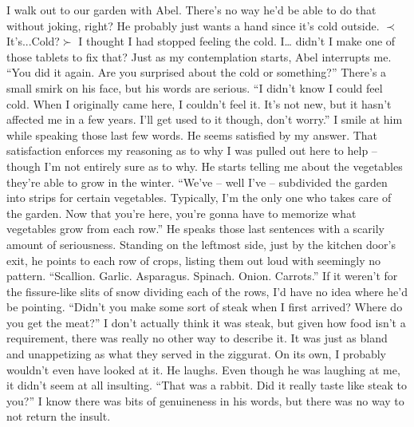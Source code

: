 \documentclass[openany, 12pt]{book}
\newcommand\tab[1][1cm]{\hspace*{#1}}
\begin{document}
\tab
I walk out to our garden with Abel. There’s no way he’d be able to do that without joking, right? He probably just wants a hand since it’s cold outside.\newline
\tab
$\prec$It's...Cold?$\succ$\newline
\tab
I thought I had stopped feeling the cold. I… didn’t I make one of those tablets to fix that? Just as my contemplation starts, Abel interrupts me.\newline
\tab
``You did it again. Are you surprised about the cold or something?'' There’s a small smirk on his face, but his words are serious.
\newline
\tab
``I didn’t know I could feel cold. When I originally came here, I couldn’t feel it. It’s not new, but it hasn't affected me in a few years. I’ll get used to it though, don’t worry.'' I smile at him while speaking those last few words. He seems satisfied by my answer. That satisfaction enforces my reasoning as to why I was pulled out here to help -- though I'm not entirely sure as to why.\newline
\tab
He starts telling me about the vegetables they’re able to grow in the winter. ``We’ve -- well I’ve -- subdivided the garden into strips for certain vegetables. Typically, I’m the only one who takes care of the garden. Now that you’re here, you’re gonna have to memorize what vegetables grow from each row.'' He speaks those last sentences with a scarily amount of seriousness. Standing on the leftmost side, just by the kitchen door’s exit, he points to each row of crops, listing them out loud with seemingly no pattern.\newline
\tab
``Scallion. Garlic. Asparagus. Spinach. Onion. Carrots.''
\newline
\tab
If it weren’t for the fissure-like slits of snow dividing each of the rows, I’d have no idea where he’d be pointing. ``Didn’t you make some sort of steak when I first arrived? Where do you get the meat?'' I don’t actually think it was steak, but given how food isn’t a requirement, there was really no other way to describe it. It was just as bland and unappetizing as what they served in the ziggurat. On its own, I probably wouldn’t even have looked at it.
\newline
\tab
He laughs. Even though he was laughing at me, it didn’t seem at all insulting. ``That was a rabbit. Did it really taste like steak to you?'' I know there was bits of genuineness in his words, but there was no way to not return the insult.
\newline
\end{document}
